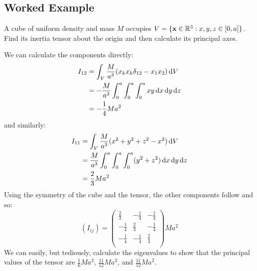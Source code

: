 \documentclass[../main.tex]{subfiles}
\begin{document}
\subsection{Worked Example}
\begin{remark}[Question]
  A cube of uniform density and mass $M$ occupies $V = \{\mathbf{\bm{x}} \in \mathbb{R}^3: x, y, z \in [0, a]\}$.
  Find its inertia tensor about the origin and then calculate its principal axes.
\end{remark}
We can calculate the components directly:
\begin{align*}
  I_{1 2} &= \int_{V} \frac{M}{a^3}(x_k x_k \delta_{1 2} - x_1 x_2) \d{V} \\
          &= - \frac{M}{a^3} \int_{0}^{a} \int_{0}^{a} \int_{0}^{a} xy \d{x} \d{y} \d{z} \\
          &= - \frac{1}{4}Ma^2
\end{align*}
and similarly:
\begin{align*}
  I_{1 1} &= \int_{V} \frac{M}{a^3}(x^2 + y^2 + z^2 - x^2) \d{V} \\
          &= \frac{M}{a^3} \int_{0}^{a} \int_{0}^{a} \int_{0}^{a} (y^2 + z^2) \d{x} \d{y} \d{z} \\
          &= \frac{2}{3}Ma^2
\end{align*}
Using the symmetry of the cube and the tensor, the other components follow and so:
\[
  (I_{i j}) = \begin{pmatrix}
  \frac{2}{3} & -\frac{1}{4} & -\frac{1}{4} \\
  -\frac{1}{4} & \frac{2}{3} & -\frac{1}{4} \\
  -\frac{1}{4} & -\frac{1}{4} & \frac{2}{3} \\
  \end{pmatrix}Ma^2
\]
We can easily, but tediously, calculate the eigenvalues to show that the principal values of the tensor are $\frac{1}{6}Ma^2$, $\frac{11}{12}Ma^2$, and $\frac{11}{12}Ma^2$.
\end{document}
